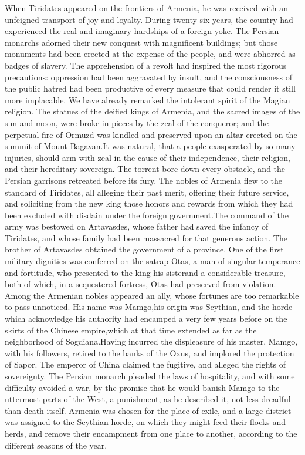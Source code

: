 When Tiridates appeared on the frontiers of Armenia, he was
received with an unfeigned transport of joy and loyalty. During
twenty-six years, the country had experienced the real and
imaginary hardships of a foreign yoke. The Persian monarchs
adorned their new conquest with magnificent buildings; but those
monuments had been erected at the expense of the people, and were
abhorred as badges of slavery. The apprehension of a revolt had
inspired the most rigorous precautions: oppression had been
aggravated by insult, and the consciousness of the public hatred
had been productive of every measure that could render it still
more implacable. We have already remarked the intolerant spirit
of the Magian religion. The statues of the deified kings of
Armenia, and the sacred images of the sun and moon, were broke in
pieces by the zeal of the conqueror; and the perpetual fire of
Ormuzd was kindled and preserved upon an altar erected on the
summit of Mount Bagavan.\footnotemark[55] It was natural, that a people
exasperated by so many injuries, should arm with zeal in the
cause of their independence, their religion, and their hereditary
sovereign. The torrent bore down every obstacle, and the Persian
garrisons retreated before its fury. The nobles of Armenia flew
to the standard of Tiridates, all alleging their past merit,
offering their future service, and soliciting from the new king
those honors and rewards from which they had been excluded with
disdain under the foreign government.\footnotemark[56] The command of the army
was bestowed on Artavasdes, whose father had saved the infancy of
Tiridates, and whose family had been massacred for that generous
action. The brother of Artavasdes obtained the government of a
province. One of the first military dignities was conferred on
the satrap Otas, a man of singular temperance and fortitude, who
presented to the king his sister\footnotemark[57] and a considerable treasure,
both of which, in a sequestered fortress, Otas had preserved from
violation. Among the Armenian nobles appeared an ally, whose
fortunes are too remarkable to pass unnoticed. His name was
Mamgo,\footnotemark[571] his origin was Scythian, and the horde which
acknowledge his authority had encamped a very few years before on
the skirts of the Chinese empire,\footnotemark[58] which at that time extended
as far as the neighborhood of Sogdiana.\footnotemark[59] Having incurred the
displeasure of his master, Mamgo, with his followers, retired to
the banks of the Oxus, and implored the protection of Sapor. The
emperor of China claimed the fugitive, and alleged the rights of
sovereignty. The Persian monarch pleaded the laws of hospitality,
and with some difficulty avoided a war, by the promise that he
would banish Mamgo to the uttermost parts of the West, a
punishment, as he described it, not less dreadful than death
itself. Armenia was chosen for the place of exile, and a large
district was assigned to the Scythian horde, on which they might
feed their flocks and herds, and remove their encampment from one
place to another, according to the different seasons of the year.

